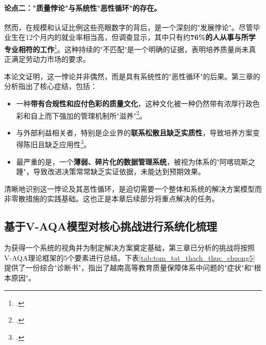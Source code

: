 \paragraph{论点二："质量悖论"与系统性"恶性循环"的存在。}
然而，在规模和认证比例这些亮眼数字的背后，是一个深刻的"发展悖论"。尽管毕业生在12个月内的就业率相当高，但调查显示，其中只有约\textbf{76\%的人从事与所学专业相符的工作}\footcite{neu_tylevieclam}。这种持续的"不匹配"是一个明确的证据，表明培养质量尚未真正满足劳动力市场的要求。

本论文证明，这一悖论并非偶然，而是具有系统性的"恶性循环"的后果。第三章的分析指出了核心症结，包括：
\begin{itemize}
    \item 一种\textbf{带有合规性和应付色彩的质量文化}，这种文化被一种仍然带有浓厚行政色彩和自上而下强加的管理机制所"滋养"\footcite{vjol_reactiveculture}。
    \item 与外部利益相关者，特别是企业界的\textbf{联系松散且缺乏实质性}，导致培养方案变得陈旧且缺乏应用性\footcite{worldbank_improvingperformance}。
    \item 最严重的是，一个\textbf{薄弱、碎片化的数据管理系统}，被视为体系的"阿喀琉斯之踵"，导致改进决策常常缺乏实证依据，未能达到预期效果。
\end{itemize}

清晰地识别这一悖论及其恶性循环，是迫切需要一个整体和系统的解决方案模型而非零散措施的实践基础。这也正是本章后续部分将重点解决的任务。

\subsection{基于V-AQA模型对核心挑战进行系统化梳理}
\label{subsec:he_thong_hoa_thach_thuc}

为获得一个系统的视角并为制定解决方案奠定基础，第三章已分析的挑战将按照V-AQA理论框架的5个要素进行总结。下表\ref{tab:tom_tat_thach_thuc_chuong5}提供了一份综合"诊断书"，指出了越南高等教育质量保障体系中问题的"症状"和"根本原因"。

